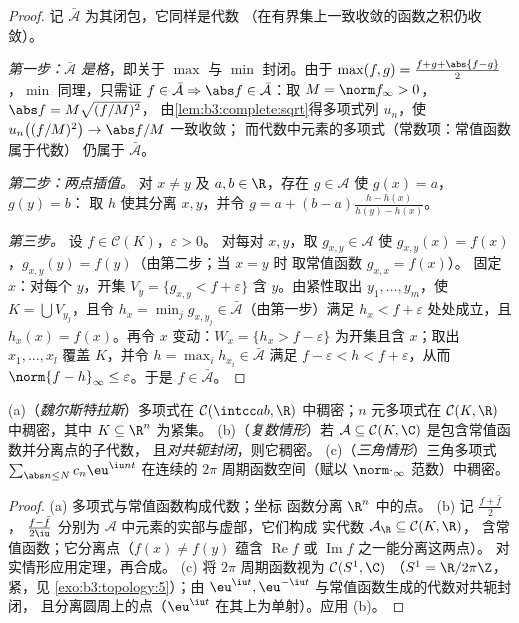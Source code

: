 \begin{proof}
记 $\bar{\mathcal A}$ 为其闭包，它同样是代数
（在有界集上一致收敛的函数之积仍收敛）。

\emph{第一步：$\bar{\mathcal A}$ 是格}，即关于
$\max$ 与 $\min$ 封闭。由于 $\max(f,g) = \frac{f + g +
\abs{f-g}}2$，$\min$ 同理，只需证 $f \in
\bar{\mathcal A} \Rightarrow \abs f \in \bar{\mathcal A}$：取
$M = \norm f_\infty > 0$，$\abs f = M\sqrt{(f/M)^2}$，
由\cref{lem:b3:complete:sqrt}得多项式列 $u_n$，使
$u_n\bigl((f/M)^2\bigr) \to \abs f/M$ 一致收敛；
而代数中元素的多项式（常数项：常值函数属于代数）
仍属于 $\bar{\mathcal A}$。

\emph{第二步：两点插值。} 对 $x \neq y$ 及 $a,
b \in \R$，存在 $g \in \mathcal A$ 使 $g(x) = a$，$g(y) = b$：
取 $h$ 使其分离 $x, y$，并令 $g = a + (b -
a)\frac{h - h(x)}{h(y) - h(x)}$。

\emph{第三步。} 设 $f \in \mathcal C(K)$，$\varepsilon > 0$。
对每对 $x, y$，取 $g_{x,y} \in \mathcal A$ 使
$g_{x,y}(x) = f(x)$，$g_{x,y}(y) = f(y)$（由第二步；当 $x = y$ 时
取常值函数 $g_{x,x} = f(x)$）。
固定 $x$：对每个 $y$，开集 $V_y = \{g_{x,y} < f +
\varepsilon\}$ 含 $y$。由紧性取出 $y_1, \dots,
y_m$，使 $K = \bigcup V_{y_j}$，且令 $h_x = \min_j g_{x, y_j}
\in \bar{\mathcal A}$（由第一步）满足 $h_x < f +
\varepsilon$ 处处成立，且 $h_x(x) = f(x)$。再令 $x$ 变动：$W_x =
\{h_x > f - \varepsilon\}$ 为开集且含 $x$；取出 $x_1,
\dots, x_l$ 覆盖 $K$，并令 $h = \max_i h_{x_i} \in
\bar{\mathcal A}$ 满足 $f - \varepsilon < h < f +
\varepsilon$，从而 $\norm{f - h}_\infty \leq \varepsilon$。于是
$f \in \bar{\mathcal A}$。
\end{proof}

\begin{corollary}\label{cor:b3:complete:weierstrass}
(a)（\emph{魏尔斯特拉斯}）多项式在 $\mathcal
C(\intcc ab, \R)$ 中稠密；$n$ 元多项式在
$\mathcal C(K, \R)$ 中稠密，其中 $K \subseteq \R^n$ 为紧集。
(b)（\emph{复数情形}）若 $\mathcal A \subseteq \mathcal
C(K, \C)$ 是包含常值函数并分离点的子代数，
且\emph{对共轭封闭}，则它稠密。
(c)（\emph{三角情形}）三角多项式
$\sum_{\abs n \leq N}c_n\eu^{\iu n t}$ 在连续的
$2\pi$ 周期函数空间（赋以
$\norm\cdot_\infty$ 范数）中稠密。
\end{corollary}

\begin{proof}
(a) 多项式与常值函数构成代数；坐标
函数分离 $\R^n$ 中的点。
(b) 记 $\frac{f + \bar f}2$，
$\frac{f - \bar f}{2\iu}$ 分别为 $\mathcal A$ 中元素的实部与虚部，它们构成
实代数 $\mathcal A_\R \subseteq \mathcal C(K, \R)$，
含常值函数；它分离点（$f(x) \ne f(y)$ 蕴含
$\operatorname{Re}f$ 或 $\operatorname{Im}f$ 之一能分离这两点）。
对实情形应用定理，再合成。
(c) 将 $2\pi$ 周期函数视为 $\mathcal C(S^1, \C)$
（$S^1 = \R/2\pi\Z$，紧，见
\cref{exo:b3:topology:5}）；由
$\eu^{\iu t}, \eu^{-\iu t}$ 与常值函数生成的代数对共轭封闭，
且分离圆周上的点（$\eu^{\iu t}$
在其上为单射）。应用 (b)。
\end{proof}

